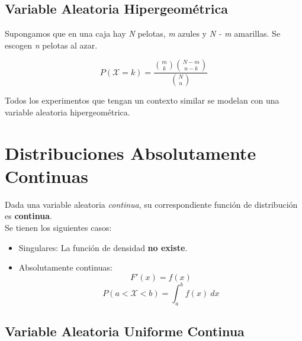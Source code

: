 \subsection{Variable Aleatoria Hipergeométrica}

Supongamos que en una caja hay \textit N pelotas, \textit m azules y \textit{N - m} amarillas. Se escogen \textit n pelotas al azar.

\[P(\mathcal X = k) = \frac{\binom{m}{k} \binom{N - m}{n-k} }{\binom{N}{n}}\]

\noindent Todos los experimentos que tengan un contexto similar se modelan con una variable aleatoria hipergeométrica.

\section{Distribuciones Absolutamente Continuas}
Dada una variable aleatoria \textit{continua}, su correspondiente función de distribución es \textbf{continua}.\\
Se tienen los siguientes casos:
\begin{itemize}
  \item Singulares: La función de densidad \textbf{no existe}.
  \item Absolutamente continuas: \[F'(x) = f(x)\] \[P(a < \mathcal X < b) = \int_a^b f(x)~dx\]
\end{itemize}

\subsection{Variable Aleatoria Uniforme Continua}



